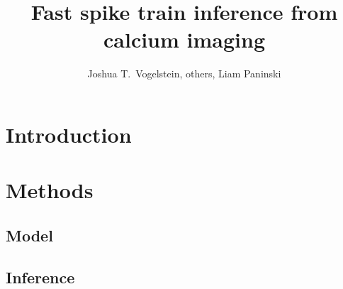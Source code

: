  
\newcommand{\zzz}{z}
\newcommand{\xT}{\ve{C}}
\newcommand{\yT}{\ve{y}}
\newcommand{\nT}{\ve{n}}
\newcommand{\zT}{\ve{n}}
\newcommand{\FT}{\ve{F}}
\newcommand{\lT}{\ve{\lam}}
\newcommand{\wX}{\widehat{\ve{C}}}
\newcommand{\wY}{\widehat{\ve{Y}}}
\newcommand{\CaT}{\Cav}
\newcommand{\ax}{\argmax_{\ve{C}_t \geq 0 \forall t}}
\newcommand{\an}{\argmin_{n_t \geq 0 \forall t}}
\newcommand{\az}{\argmin_{\bM \bC \geq \ve{0}}}
\newcommand{\ath}{\argmax_{\bth \in \ve{\Theta}}}
\newcommand{\ann}{\argmin_{n_t \in \mathbb{N}_0 \forall t}}
\newcommand{\hnm}{\widehat{\bn}}
\newcommand{\hCm}{\widehat{\bC}}


\title{Fast spike train inference from calcium imaging}

\author{Joshua T.~Vogelstein, others, Liam Paninski}



\maketitle

\begin{abstract}
 

\end{abstract}

\section{Introduction}


\section{Methods} \label{sec:methods}

\subsection{Model}


\subsection{Inference} \label{sec:inf}



